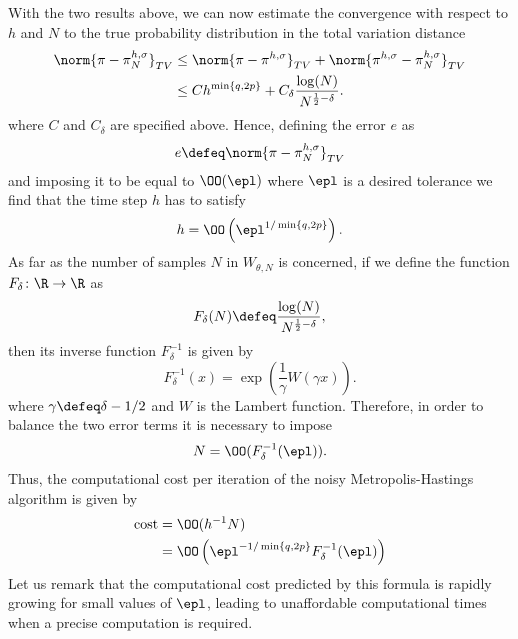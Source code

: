 \noindent With the two results above, we can now estimate the convergence with respect to $h$ and $N$ to the true probability distribution in the total variation distance
\begin{equation}
\begin{aligned}
	\norm{\pi- \pi_N^{h, \sigma}}_{TV} &\leq \norm{\pi - \pi^{h, \sigma}}_{TV} + \norm{\pi^{h,\sigma} - \pi_N^{h, \sigma}}_{TV}\\
									   &\leq C h^{\min\left\{q,2p\right\}} + C_{\delta} \frac{\log(N)}{N^{\frac{1}{2} - \delta}}.
\end{aligned}
\end{equation}
where $C$ and $C_\delta$ are specified above. Hence, defining the error $e$ as
\begin{equation}
	e \defeq \norm{\pi- \pi_N^{h, \sigma}}_{TV}
\end{equation} 
and imposing it to be equal to $\OO(\epl)$ where $\epl$ is a desired tolerance we find that the time step $h$ has to satisfy
\begin{equation}
	h = \OO\left(\epl^{1/\min\left\{q,2p\right\}}\right).
\end{equation}
As far as the number of samples $N$ in $W_{\theta,N}$ is concerned, if we define the function $F_\delta\colon\R\to\R$ as
\begin{equation}
	F_\delta(N) \defeq \frac{\log(N)}{N^{\frac{1}{2} - \delta}},
\end{equation}
then its inverse function $F_\delta^{-1}$ is given by
\begin{equation}
	F_\delta^{-1}(x) = \exp\left(\frac{1}{\gamma}W(\gamma x)\right).
\end{equation}
where $\gamma \defeq \delta - 1/2$ and $W$ is the Lambert function. Therefore, in order to balance the two error terms it is necessary to impose
\begin{equation}
	N = \OO(F_\delta^{-1}(\epl)).
\end{equation}
Thus, the computational cost per iteration of the noisy Metropolis-Hastings algorithm is given by
\begin{equation}
\begin{aligned}
	\mathrm{cost} &= \OO(h^{-1}N) \\
				  &= \OO\left(\epl^{-1/\min\left\{q,2p\right\}}F_\delta^{-1}(\epl)\right)
\end{aligned}
\end{equation}
Let us remark that the computational cost predicted by this formula is rapidly growing for small values of $\epl$, leading to unaffordable computational times when a precise computation is required.

